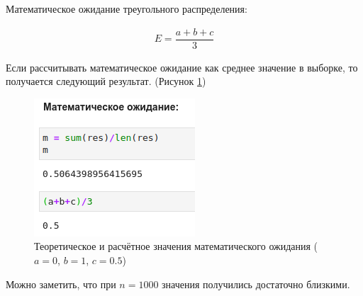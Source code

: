 \documentclass[14pt,fleqn]{extarticle}
\begin{document}
	Математическое ожидание треугольного распределения:
	\begin{ceqn}
	\begin{align*}
		E = \dfrac{a + b + c}{3}
	\end{align*}
	\end{ceqn}
	\newpage
	Если рассчитывать математическое ожидание как среднее значение в выборке, то получается следующий результат. (Рисунок \ref{fig:triangle_inverse_function_method_math})
	\begin{figure}[h]
		\centering \includegraphics[scale=0.7]{result42}
		\caption{Теоретическое и расчётное значения математического ожидания ($a = 0$, $b = 1$, $c = 0.5$)}
		\label{fig:triangle_inverse_function_method_math}
	\end{figure}
	
	Можно заметить, что при $n = 1000$ значения получились достаточно близкими.\\
\end{document}
